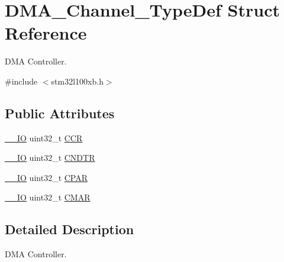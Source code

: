 \hypertarget{struct_d_m_a___channel___type_def}{\section{D\-M\-A\-\_\-\-Channel\-\_\-\-Type\-Def Struct Reference}
\label{struct_d_m_a___channel___type_def}
}


D\-M\-A Controller.  




{\ttfamily \#include $<$stm32l100xb.\-h$>$}

\subsection*{Public Attributes}
\begin{DoxyCompactItemize}
\item 
\hyperlink{core__sc300_8h_aec43007d9998a0a0e01faede4133d6be}{\-\_\-\-\_\-\-I\-O} uint32\-\_\-t \hyperlink{struct_d_m_a___channel___type_def_aa4938d438293f76ff6d9a262715c23eb}{C\-C\-R}
\item 
\hyperlink{core__sc300_8h_aec43007d9998a0a0e01faede4133d6be}{\-\_\-\-\_\-\-I\-O} uint32\-\_\-t \hyperlink{struct_d_m_a___channel___type_def_af1c675e412fb96e38b6b4630b88c5676}{C\-N\-D\-T\-R}
\item 
\hyperlink{core__sc300_8h_aec43007d9998a0a0e01faede4133d6be}{\-\_\-\-\_\-\-I\-O} uint32\-\_\-t \hyperlink{struct_d_m_a___channel___type_def_a8ce1c9c2742eaaa0e97ddbb3a06154cc}{C\-P\-A\-R}
\item 
\hyperlink{core__sc300_8h_aec43007d9998a0a0e01faede4133d6be}{\-\_\-\-\_\-\-I\-O} uint32\-\_\-t \hyperlink{struct_d_m_a___channel___type_def_a7a9886b5f9e0edaf5ced3d1870b33ad7}{C\-M\-A\-R}
\end{DoxyCompactItemize}


\subsection{Detailed Description}
D\-M\-A Controller. 

